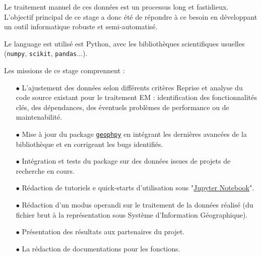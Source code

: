 \documentclass[12pt]{article}
\begin{document}
    Le traitement manuel de ces données est un processus long et fastidieux. L'objectif principal de ce stage a donc été de répondre à ce besoin en développant un outil informatique robuste et semi-automatisé.

    Le language est utilisé est Python, avec les bibliothèques scientifiques usuelles (\texttt{numpy}, \texttt{scikit}, \texttt{pandas}...).

    Les missions de ce stage comprennent :

    \begin{enumerate}
        \item[$\bullet$] L'ajustement des données selon différents critères Reprise et analyse du code source existant pour le traitement EM : identification des fonctionnalités clés, des dépendances, des éventuels problèmes de performance ou de maintenabilité.
        \item[$\bullet$] Mise à jour du package \href{https://pypi.org/project/GeophPy/}{\texttt{geophpy}} en intégrant les dernières avancées de la bibliothèque et en corrigeant les bugs identifiés.
        \item[$\bullet$] Intégration et tests du package sur des données issues de projets de recherche en cours.
        \item[$\bullet$] Rédaction de tutoriels e quick-starts d’utilisation sous "\href{https://jupyter.org/}{Jupyter Notebook}".
        \item[$\bullet$] Rédaction d’un modus operandi sur le traitement de la données réalisé (du fichier brut à la représentation sous Système d'Information Géographique).
        \item[$\bullet$] Présentation des résultats aux partenaires du projet.
        \item[$\bullet$] La rédaction de documentations pour les fonctions.
    \end{enumerate}
\end{document}
